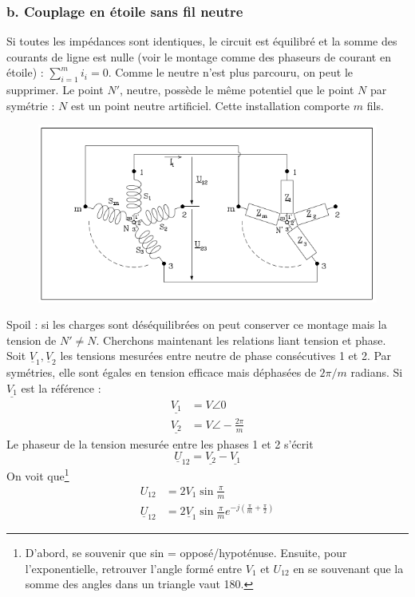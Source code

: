 \subsubsection{b. Couplage en étoile sans fil neutre}
Si toutes les impédances sont identiques, le circuit est équilibré et 
la somme des courants de ligne est nulle (voir le montage comme des phaseurs de courant en étoile) : $\sum_{i=1}^m i_i=0$. Comme 
le neutre n'est plus parcouru, on peut le supprimer. Le point $N'$, 
neutre, possède le même potentiel que le point $N$ par symétrie : $N$ 
est un point neutre artificiel. Cette installation comporte $m$ fils.\\
\begin{figure}
	\vspace{-8mm}
	\includegraphics[scale=0.4]{ch1/image7.png}
\end{figure}		
Spoil : si les charges sont déséquilibrées on peut conserver ce montage 
mais la tension de $N' \neq N$. Cherchons maintenant les relations liant 
tension et phase.\\
Soit $\underline{V}_1, \underline{V}_2$ les tensions mesurées entre 
neutre de phase consécutives 1 et 2. Par symétries, elle sont égales 
en tension efficace mais déphasées de $2\pi/m$ radians. Si $\underline{
V_1}$ est la référence :
\begin{equation}
	\begin{array}{ll}
		\underline{V_1} & = V\angle 0               \\
		\underline{V_2} & = V\angle -\frac{2\pi}{m} 
	\end{array}
\end{equation}
Le phaseur de la tension mesurée entre les phases 1 et 2 s'écrit
\begin{equation}
	\underline{U}_{12} = \underline{V_2}-\underline{V_1}
\end{equation}
On voit que\footnote{D'abord, se souvenir que sin = opposé/hypoténuse. Ensuite, pour l'exponentielle, retrouver l'angle formé entre $V_1$ et $U_{12}$ en se souvenant que la somme des angles dans un triangle vaut 180\degres .} 
\begin{equation}
	\begin{array}{ll}
		U_{12}             & = 2V_1\sin\frac{\pi}{m}                    \\  
		\underline{U}_{12} & = 2\underline{V}_1\sin \frac{\pi}{m}e^{-j\left( 
		\frac{\pi}{m}+\frac{\pi}{2}\right)}
	\end{array}
\end{equation}
		
